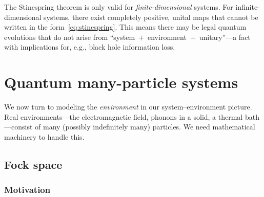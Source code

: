 \begin{center}
\end{center}

\begin{remark}
  The Stinespring theorem is only valid for \emph{finite-dimensional}
  systems.  For infinite-dimensional systems, there exist completely
  positive, unital maps that cannot be written in the
  form~\eqref{eq:stinespring}.  This means there may be legal quantum
  evolutions that do not arise from ``system~$+$~environment~$+$~unitary''---a
  fact with implications for, e.g., black hole information loss.
\end{remark}

\section{Quantum many-particle systems}\label{sec:many-particle}

We now turn to modeling the \emph{environment} in our
system--environment picture.  Real environments---the electromagnetic
field, phonons in a solid, a thermal bath---consist of many (possibly
indefinitely many) particles.  We need mathematical machinery to handle
this.

\subsection{Fock space}\label{sec:fock-space}

\subsubsection{Motivation}

